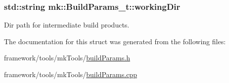 \subsubsection[{\texorpdfstring{working\+Dir}{workingDir}}]{\setlength{\rightskip}{0pt plus 5cm}std\+::string mk\+::\+Build\+Params\+\_\+t\+::working\+Dir}\hypertarget{structmk_1_1_build_params__t_a8077185bba84311c65d09b5198d3a9cb}{}\label{structmk_1_1_build_params__t_a8077185bba84311c65d09b5198d3a9cb}


Dir path for intermediate build products. 



The documentation for this struct was generated from the following files\+:\begin{DoxyCompactItemize}
\item 
framework/tools/mk\+Tools/\hyperlink{build_params_8h}{build\+Params.\+h}\item 
framework/tools/mk\+Tools/\hyperlink{build_params_8cpp}{build\+Params.\+cpp}\end{DoxyCompactItemize}
